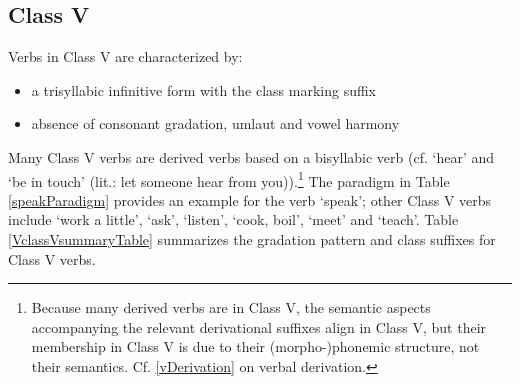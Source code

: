 \clearpage

\subsection{Class V}\label{VclassV}
Verbs in Class V are characterized by: 
\begin{itemize}
\item{a trisyllabic infinitive form with the class marking suffix }
\item{absence of consonant gradation, umlaut and vowel harmony} 
\end{itemize}
Many Class V verbs are derived verbs based on a bisyllabic verb (cf.  ‘hear’ and  ‘be in touch’ (lit.: let someone hear from you)).\footnote{Because many derived verbs are in Class V, the semantic aspects accompanying the relevant derivational suffixes align in Class V, but their membership in Class V is due to their \mbox{(morpho-)phonemic} structure, not their semantics. Cf. \SEC\ref{vDerivation} on verbal derivation.} 
The paradigm in Table \vref{speakParadigm} provides an example for the verb  ‘speak’; 
other Class V verbs include  ‘work a little’,  ‘ask’,  ‘listen’,  ‘cook, boil’,  ‘meet’ and  ‘teach’. 
Table \vref{VclassVsummaryTable} summarizes the gradation pattern and class suffixes for Class V verbs. %
